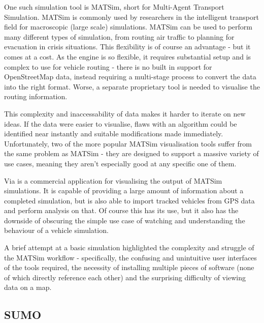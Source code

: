 \documentclass[ %
                    author={Alexander Hill},
                supervisor={Dr. Benjamin Sach},
                    degree={MEng},
                     title={MARMOSET},
                  subtitle={Multi-Agent Route Management using Online Simulation for Efficient Transportation},
                      type={research},
                      year={2016} ]{dissertation}
\begin{document}
One such simulation tool is MATSim, short for Multi-Agent Transport Simulation.
MATSim is commonly used by researchers in the intelligent transport field for
macroscopic (large scale) simulations. MATSim can be used to perform many
different types of simulation, from routing air traffic to planning for
evacuation in crisis situations. This flexibility is of course an advantage -
but it comes at a cost. As the engine is so flexible, it requires substantial
setup and is complex to use for vehicle routing - there is no built in support
for OpenStreetMap data, instead requiring a multi-stage process to convert the
data into the right format. Worse, a separate proprietary tool is needed to
visualise the routing information.

This complexity and inaccessability of data makes it harder to iterate on new
ideas. If the data were easier to visualise, flaws with an algorithm could be
identified near instantly and suitable modifications made immediately.
Unfortunately, two of the more popular MATSim visualisation tools suffer from
the same problem as MATSim - they are designed to support a massive variety of
use cases, meaning they aren't especially good at any specific one of them.

Via is a commercial application for visualising the output of MATSim
simulations. It is capable of providing a large amount of information about a
completed simulation, but is also able to import tracked vehicles from GPS data
and perform analysis on that. Of course this has its use, but it also has the
downside of obscuring the simple use case of watching and understanding the
behaviour of a vehicle simulation.

A brief attempt at a basic simulation highlighted the complexity and struggle of
the MATSim workflow - specifically, the confusing and unintuitive user
interfaces of the tools required, the necessity of installing multiple pieces of
software (none of which directly reference each other) and the surprising
difficulty of viewing data on a map.

\subsection{SUMO}
\end{document}

